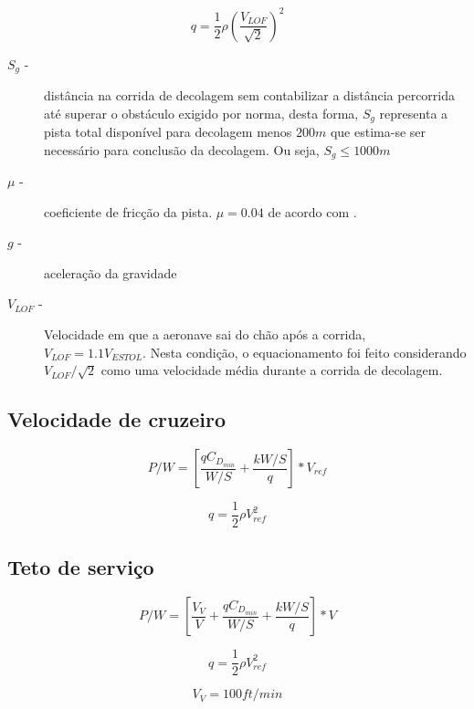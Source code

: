 \begin{equation}
q = \frac{1}{2} \rho \left(\frac{V_{LOF}}{\sqrt{2}} \right)^2
\end{equation}
 
\begin{description}
 \item[$S_g$  -]distância na corrida de decolagem sem contabilizar a distância percorrida até superar o obstáculo exigido por norma, desta forma, $S_g$ representa a pista total disponível para decolagem menos $200 m$ que estima-se ser necessário para conclusão da decolagem. Ou seja, $S_g \leq 1000m$
 \item[$\mu$ -]coeficiente de fricção da pista. $\mu = 0.04$ de acordo com \cite{gudmundsson}.
 \item[$g$  -]aceleração da gravidade
 \item[$V_{LOF}$  -]Velocidade em que a aeronave sai do chão após a corrida, $V_{LOF} = 1.1 V_{ESTOL}$. Nesta condição, o equacionamento foi feito considerando $V_{LOF}/\sqrt{2}$ como uma velocidade média durante a corrida de decolagem.
\end{description}

\subsection{Velocidade de cruzeiro}

\begin{equation}
P/W = \left[ \frac{q C_{D_{min}}}{W/S} + \frac{k W/S}{q} \right] * V_{ref}
\end{equation}

\begin{equation}
q = \frac{1}{2} \rho V_{ref}^2
\end{equation}

\subsection{Teto de serviço}
\begin{equation}
P/W = \left[ \frac{V_V}{V} + \frac{q C_{D_{min}}}{W/S} +  \frac{k W/S}{q} \right] * V 
\end{equation}

\begin{equation}
q = \frac{1}{2} \rho V_{ref}^2
\end{equation}

\begin{equation}
V_V = 100 ft/min 
\end{equation}

